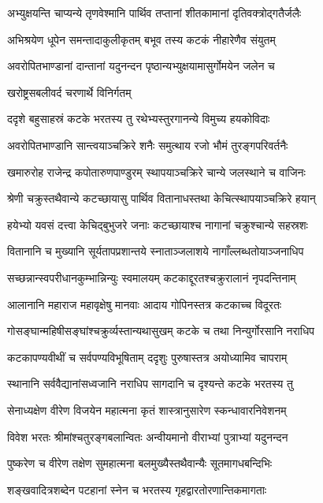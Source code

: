 \twolineshloka
{अभ्युक्षयन्ति चाप्यन्ये तृणवेश्मानि पार्थिव}
{तप्तानां शीतकामानां दृतिवक्त्रोद्गतैर्जलैः}%

\twolineshloka
{अभिश्रयेण धूपेन समन्तादाकुलीकृतम्}
{बभूव तस्य कटकं नीहारेणैव संयुतम्}%

\twolineshloka
{अवरोपितभाण्डानां दान्तानां यदुनन्दन}
{पृष्ठान्यभ्युक्षयामासुर्गोमयेन जलेन च}%

\onelineshloka
{खरोष्ट्रसबलीवर्द चरणार्थे विनिर्गतम्}%

\twolineshloka
{ददृशे बहुसाहस्रं कटके भरतस्य तु}
{रथेभ्यस्तुरगानन्ये विमुच्य हयकोविदाः}%

\twolineshloka
{अवरोपितभाण्डानि सान्त्वयाञ्चक्रिरे शनैः}
{समुत्थाय रजो भौमं तुरङ्गपरिवर्तनैः}%

\twolineshloka
{खमारुरोह राजेन्द्र कपोतारुणपाण्डुरम्}
{स्थापयाञ्चक्रिरे चान्ये जलस्थाने च वाजिनः}%

\twolineshloka
{श्रेणी चक्रुस्तथैवान्ये कटच्छायासु पार्थिव}
{वितानाधस्तथा केचित्स्थापयाञ्चक्रिरे हयान्}%

\twolineshloka
{हयेभ्यो यवसं दत्त्वा केचिद्बुभुजरे जनाः}
{कटच्छायाश्च नागानां चक्रुश्चान्ये सहस्रशः} %

\twolineshloka
{वितानानि च मुख्यानि सूर्यतापप्रशान्तये}
{स्नाताञ्जलाशये नागाँल्लब्धतोयाञ्जनाधिप}%

\twolineshloka
{सच्छन्नान्स्वपरीधानकुम्भान्निन्युः स्वमालयम्}
{कटकाद्दूरतश्चक्रुरालानं नृपदन्तिनाम्}%

\twolineshloka
{आलानानि महाराज महावृक्षेषु मानवाः}
{आदाय गोपिनस्तत्र कटकाच्च विदूरतः}%

\twolineshloka
{गोसङ्घान्महिषीसङ्घांश्चक्रुर्व्यस्तान्यथासुखम्}
{कटके च तथा निन्युर्गोरसानि नराधिप}%

\twolineshloka
{कटकापण्यवीथीं च सर्वपण्यविभूषिताम्}
{ददृशुः पुरुषास्तत्र अयोध्यामिव चापराम्}%

\twolineshloka
{स्थानानि सर्ववैद्यानांसध्वजानि नराधिप}
{सागदानि च दृश्यन्ते कटके भरतस्य तु}%

\twolineshloka
{सेनाध्यक्षेण वीरेण विजयेन महात्मना}
{कृतं शास्त्रानुसारेण स्कन्धावारनिवेशनम्}%

\twolineshloka
{विवेश भरतः श्रीमांश्चतुरङ्गबलान्वितः}
{अन्वीयमानो वीराभ्यां पुत्राभ्यां यदुनन्दन}%

\twolineshloka
{पुष्करेण च वीरेण तक्षेण सुमहात्मना}
{बलमुख्यैस्तथैवान्यैः सूतमागधबन्दिभिः}%

\twolineshloka
{शङ्खवादित्रशब्देन पटहानां स्नेन च}
{भरतस्य गृहद्वारतोरणान्तिकमागताः} %

